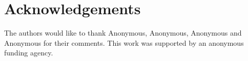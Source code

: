 \documentclass[letterpaper]{article} %
\begin{document}
\section*{Acknowledgements}


The authors would like to thank Anonymous, Anonymous, Anonymous and Anonymous for their comments.
This work was supported by an anonymous funding agency.



\end{document}
